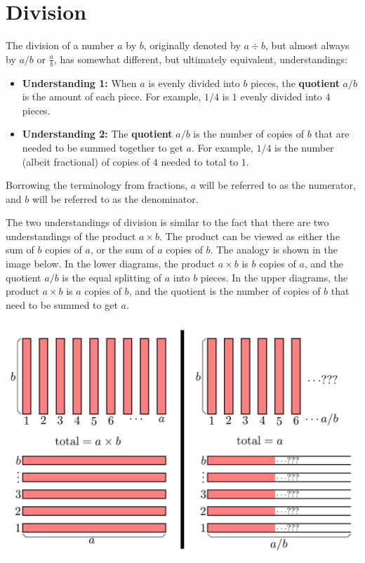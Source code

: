 \documentclass{article}
\begin{document}
\section{Division}

The division of a number \(a\) by \(b\), originally denoted by \(a \div b\), but almost always by \(a/b\) or \(\frac{a}{b}\), has somewhat different, but ultimately equivalent, understandings:
\begin{itemize}
\item \textbf{Understanding 1:} When \(a\) is evenly divided into \(b\) pieces, the {\bf quotient} \(a/b\) is the amount of each piece. For example, \(1/4\) is \(1\) evenly divided into \(4\) pieces.
\item \textbf{Understanding 2:} The {\bf quotient} \(a/b\) is the number of copies of \(b\) that are needed to be summed together to get \(a\). For example, \(1/4\) is the number (albeit fractional) of copies of \(4\) needed to total to \(1\). 
\end{itemize}
Borrowing the terminology from fractions, \(a\) will be referred to as the numerator, and \(b\) will be referred to as the denominator.

The two understandings of division is similar to the fact that there are two understandings of the product \(a \times b\). The product can be viewed as either the sum of \(b\) copies of \(a\), or the sum of \(a\) copies of \(b\). The analogy is shown in the image below. In the lower diagrams, the product \(a \times b\) is \(b\) copies of \(a\), and the quotient \(a/b\) is the equal splitting of \(a\) into \(b\) pieces. In the upper diagrams, the product \(a \times b\) is \(a\) copies of \(b\), and the quotient is the number of copies of \(b\) that need to be summed to get \(a\).

\includegraphics[width = \textwidth]{multiplication_vs_division}
\end{document}
